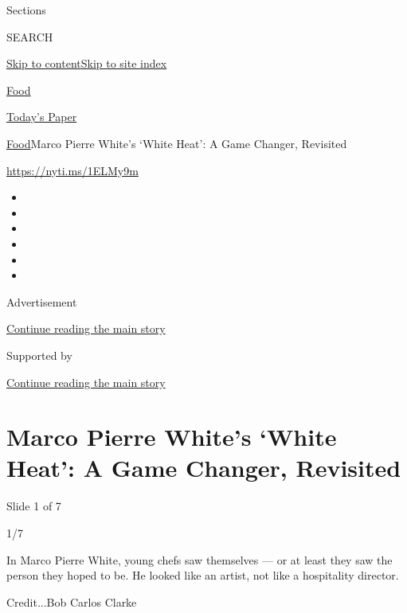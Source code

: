 Sections

SEARCH

\protect\hyperlink{site-content}{Skip to
content}\protect\hyperlink{site-index}{Skip to site index}

\href{https://www.nytimes.com/section/food}{Food}

\href{https://myaccount.nytimes.com/auth/login?response_type=cookie\&client_id=vi}{}

\href{https://www.nytimes.com/section/todayspaper}{Today's Paper}

\href{/section/food}{Food}\textbar{}Marco Pierre White's `White Heat': A
Game Changer, Revisited

\url{https://nyti.ms/1ELMy9m}

\begin{itemize}
\item
\item
\item
\item
\item
\item
\end{itemize}

Advertisement

\protect\hyperlink{after-top}{Continue reading the main story}

Supported by

\protect\hyperlink{after-sponsor}{Continue reading the main story}

\hypertarget{marco-pierre-whites-white-heat-a-game-changer-revisited}{%
\section{Marco Pierre White's `White Heat': A Game Changer,
Revisited}\label{marco-pierre-whites-white-heat-a-game-changer-revisited}}

Slide 1 of 7

1/7

In Marco Pierre White, young chefs saw themselves --- or at least they
saw the person they hoped to be. He looked like an artist, not like a
hospitality director.

Credit...Bob Carlos Clarke

